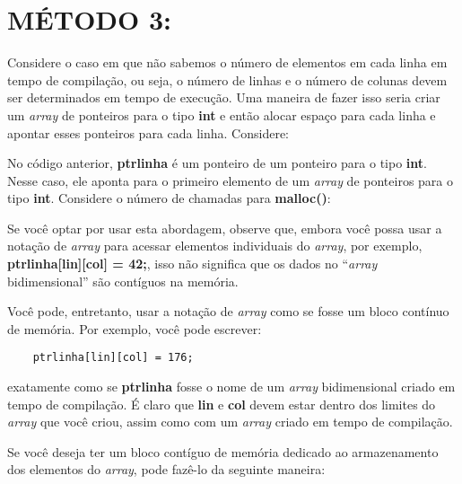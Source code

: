 \section*{MÉTODO 3:}
Considere o caso em que não sabemos o número de elementos em cada linha em tempo de compilação, ou seja, o número de linhas e o número de colunas devem ser determinados em tempo de execução. Uma maneira de fazer isso seria criar um \textit{array} de ponteiros para o tipo \textbf{int} e então alocar espaço para cada linha e apontar esses ponteiros para cada linha. Considere:


No código anterior, \textbf{ptrlinha} é um ponteiro de um ponteiro para o tipo \textbf{int}. Nesse caso, ele aponta para o primeiro elemento de um \textit{array} de ponteiros para o tipo \textbf{int}. Considere o número de chamadas para \textbf{malloc()}:


Se você optar por usar esta abordagem, observe que, embora você possa usar a notação de \textit{array} para acessar elementos individuais do \textit{array}, por exemplo, \textbf{ptrlinha[lin][col] = 42;}, isso não significa que os dados no ``\textit{array} bidimensional'' são contíguos na memória.

Você pode, entretanto, usar a notação de \textit{array} como se fosse um bloco contínuo de memória. Por exemplo, você pode escrever:
\begin{lstlisting}
	ptrlinha[lin][col] = 176;
\end{lstlisting}
exatamente como se \textbf{ptrlinha} fosse o nome de um \textit{array} bidimensional criado em tempo de compilação. É claro que \textbf{lin} e \textbf{col} devem estar dentro dos limites do \textit{array} que você criou, assim como com um \textit{array} criado em tempo de compilação.

Se você deseja ter um bloco contíguo de memória dedicado ao armazenamento dos elementos do \textit{array}, pode fazê-lo da seguinte maneira:

